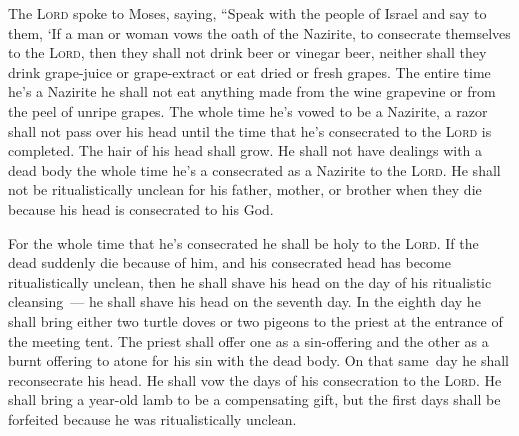 
\begin{inparaenum}
   The \textsc{Lord} spoke to Moses, saying,%
   ``Speak with the people of Israel and say to them, `If a man or woman vows the oath of the Nazirite, to consecrate themselves to the \textsc{Lord},%
   then they shall not drink beer or vinegar beer, neither shall they drink grape-juice or grape-extract or eat dried or fresh grapes.%
   The entire time he's a Nazirite he shall not eat anything made from the wine grapevine or from the peel of unripe grapes.%
   The whole time he's vowed to be a Nazirite, a razor shall not pass over his head until the time that he's consecrated to the \textsc{Lord} is completed. The hair of his head shall grow.%
   He shall not have dealings with a dead body the whole time he's a consecrated as a Nazirite to the \textsc{Lord}.%
   He shall not be ritualistically unclean for his father, mother, or brother when they die because his head is consecrated to his God.%
  
   For the whole time that he's consecrated he shall be holy to the \textsc{Lord}.%
   If the dead suddenly die because of him, and his consecrated head has become ritualistically unclean, then he shall shave his head on the day of his ritualistic cleansing~--- he shall shave his head on the seventh day.%
   In the eighth day he shall bring either two turtle doves or two pigeons to the priest at the entrance of the meeting tent.%
   The priest shall offer one as a sin-offering and the other as a burnt offering to atone for his sin with the dead body. On that same\understood\ day he shall reconsecrate his head.%
   He shall vow the days of his consecration to the \textsc{Lord}. He shall bring a year-old lamb to be a compensating gift, but the first days shall be forfeited because he was ritualistically unclean.%
  

\end{inparaenum}
